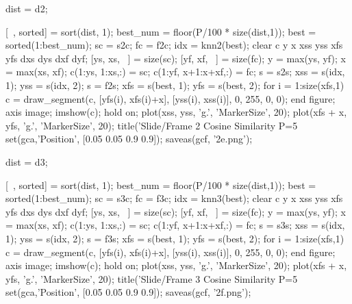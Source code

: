 dist = d2;

[~, sorted] = sort(dist, 1);
best_num = floor(P/100 * size(dist,1));
best = sorted(1:best_num);
sc = s2c;
fc = f2c;
idx = knn2(best);
clear c y x xss yss xfs yfs dxs dys dxf dyf;
[ys, xs, ~] = size(sc);
[yf, xf, ~] = size(fc);
y = max(ys, yf);
x = max(xs, xf);
c(1:ys, 1:xs,:) = sc;
c(1:yf, x+1:x+xf,:) = fc;
s = s2s;
xss = s(idx, 1);
yss = s(idx, 2);
s = f2s;
xfs = s(best, 1);
yfs = s(best, 2);
for i = 1:size(xfs,1)
    c = draw_segment(c, [yfs(i), xfs(i)+x], [yss(i), xss(i)], 0, 255, 0, 0);
end
figure;
axis image;
imshow(c);
hold on;
plot(xss, yss, 'g.', 'MarkerSize', 20);
plot(xfs + x, yfs, 'g.', 'MarkerSize', 20);
title('Slide/Frame 2 Cosine Similarity P=5%
set(gca,'Position', [0.05 0.05 0.9 0.9]);
saveas(gcf, '2e.png');

dist = d3;

[~, sorted] = sort(dist, 1);
best_num = floor(P/100 * size(dist,1));
best = sorted(1:best_num);
sc = s3c;
fc = f3c;
idx = knn3(best);
clear c y x xss yss xfs yfs dxs dys dxf dyf;
[ys, xs, ~] = size(sc);
[yf, xf, ~] = size(fc);
y = max(ys, yf);
x = max(xs, xf);
c(1:ys, 1:xs,:) = sc;
c(1:yf, x+1:x+xf,:) = fc;
s = s3s;
xss = s(idx, 1);
yss = s(idx, 2);
s = f3s;
xfs = s(best, 1);
yfs = s(best, 2);
for i = 1:size(xfs,1)
    c = draw_segment(c, [yfs(i), xfs(i)+x], [yss(i), xss(i)], 0, 255, 0, 0);
end
figure;
axis image;
imshow(c);
hold on;
plot(xss, yss, 'g.', 'MarkerSize', 20);
plot(xfs + x, yfs, 'g.', 'MarkerSize', 20);
title('Slide/Frame 3 Cosine Similarity P=5%
set(gca,'Position', [0.05 0.05 0.9 0.9]);
saveas(gcf, '2f.png');

